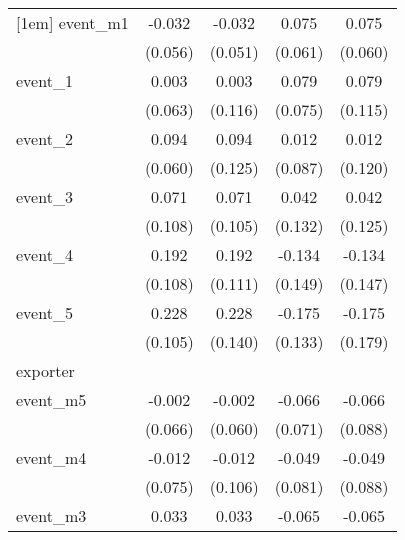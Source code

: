 {\begin{tabular}{l*{4}{c}}
[1em]
event\_m1    &      -0.032         &      -0.032         &       0.075         &       0.075         \\
            &     (0.056)         &     (0.051)         &     (0.061)         &     (0.060)         \\
[1em]
event\_1     &       0.003         &       0.003         &       0.079         &       0.079         \\
            &     (0.063)         &     (0.116)         &     (0.075)         &     (0.115)         \\
[1em]
event\_2     &       0.094         &       0.094         &       0.012         &       0.012         \\
            &     (0.060)         &     (0.125)         &     (0.087)         &     (0.120)         \\
[1em]
event\_3     &       0.071         &       0.071         &       0.042         &       0.042         \\
            &     (0.108)         &     (0.105)         &     (0.132)         &     (0.125)         \\
[1em]
event\_4     &       0.192         &       0.192         &      -0.134         &      -0.134         \\
            &     (0.108)         &     (0.111)         &     (0.149)         &     (0.147)         \\
[1em]
event\_5     &       0.228\sym{*}  &       0.228         &      -0.175         &      -0.175         \\
            &     (0.105)         &     (0.140)         &     (0.133)         &     (0.179)         \\
\hline
exporter    &                     &                     &                     &                     \\
event\_m5    &      -0.002         &      -0.002         &      -0.066         &      -0.066         \\
            &     (0.066)         &     (0.060)         &     (0.071)         &     (0.088)         \\
[1em]
event\_m4    &      -0.012         &      -0.012         &      -0.049         &      -0.049         \\
            &     (0.075)         &     (0.106)         &     (0.081)         &     (0.088)         \\
[1em]
event\_m3    &       0.033         &       0.033         &      -0.065         &      -0.065         \\

\end{tabular}}
